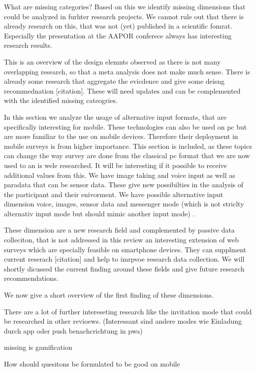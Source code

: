 What are missing categories?
Based on this we identify missing dimensions that could be analyzed in furhter research projects. We cannot rule out that there is already research on this, that was not (yet) published in a scientific fomrat. Especially the presentation at the AAPOR conferece always has interesting research results. 

This is an overview of the design elemnts observed as there is not many overlapping research, so that a meta analysis does not make much sense. There is already some research that aggregate the evicdence and give some deisng recommednation [citation]. These will need updates and can be complemented with the identified missing cateogries.

In this section we analyze the usage of alternative input formats, that are specifically interesting for mobile. These technologies can also be used on pc but are more familiar to the use on mobile devices. Therefore their deployment in mobile surveys is from higher importance. This section is included, as these topics can change the way survey are done from the classical pc format that we are now used to an is wele researched. It will be interesting if it possible to receive additional values from this. We have image taking and voice input as well as paradata that can be sensor data. These give new possibilties in the analysis of the participant and their enivorment. We have possible alternative input dimension voice, images, sensor data and messenger mode (which is not striclty alternativ input mode but should mimic another input mode) . 

These dimension are a new research field and complemented by passive data colleciton, that is not addressed in this review an interesting extension of web surveys which are specially feasible on smartphone devices. They can supplment current reserach [citation] and help to imrpvoe research data collection. We will shortly dicussed the current finding around these fields and give future research recommendations. 

We now give a short overview of the first finding of these dimensions.

There are a lot of further intereseting research like the invitation mode that could be researched in other revioews. 
(Interessant sind andere modes wie Einladung durch app oder push benachcrichtung in pwa)


missing is gamification

How should quesitons be formulated to be good on mobile